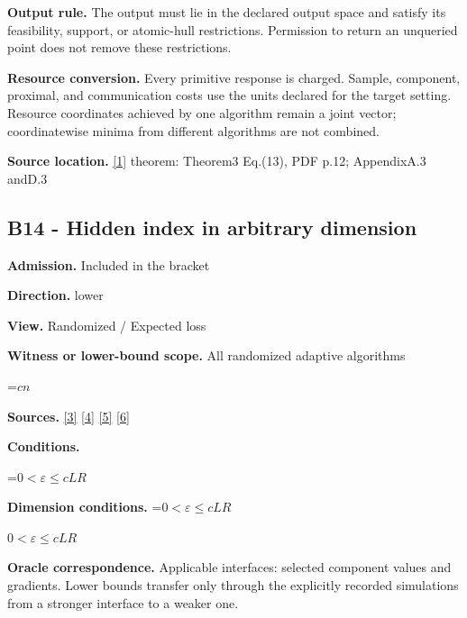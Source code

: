 \documentclass[10pt,a4paper]{article}
\newcommand{\AtlasMath}[1]{\par\begingroup\centering\setbox0=\hbox{$\displaystyle #1$}\ifdim\wd0>1.4\linewidth\typeout{ATLAS WIDE FORMULA: \the\wd0}\fi\ifdim\wd0>\linewidth\resizebox{\linewidth}{!}{\box0}\else\box0\fi\par\endgroup}
\newcommand{\AtlasInlineMath}[1]{\begingroup\setbox0=\hbox{$#1$}\ifdim\wd0>.4\linewidth\endgroup\AtlasMath{#1}\else\endgroup$#1$\fi}
\begin{document}
\textbf{Output rule.} The output must lie in the declared output space and satisfy its feasibility, support, or atomic-hull restrictions. Permission to return an unqueried point does not remove these restrictions.



\textbf{Resource conversion.} Every primitive response is charged. Sample, component, proximal, and communication costs use the units declared for the target setting. Resource coordinates achieved by one algorithm remain a joint vector; coordinatewise minima from different algorithms are not combined.



\textbf{Source location.} \href{https://arxiv.org/pdf/2105.01778}{[1]} theorem: Theorem3 Eq.(13), PDF p.12; AppendixA.3 andD.3



\subsection{B14 - Hidden index in arbitrary dimension}


\textbf{Admission.} Included in the bracket



\textbf{Direction.} lower



\textbf{View.} Randomized / Expected loss



\textbf{Witness or lower-bound scope.} All randomized adaptive algorithms



\AtlasMath{cn}


\textbf{Sources.} \href{https://arxiv.org/pdf/2311.10886}{[3]} \href{https://arxiv.org/pdf/1405.4980}{[4]} \href{https://www2.isye.gatech.edu/~nemirovs/MOR_AccuracyCertificates.pdf}{[5]} \href{https://arxiv.org/pdf/2609.20701}{[6]}



\textbf{Conditions.}
\AtlasMath{0<\varepsilon\le cLR}




\textbf{Dimension conditions.} \AtlasInlineMath{0<\varepsilon\le cLR}



\textbf{Oracle correspondence.} Applicable interfaces: selected component values and gradients. Lower bounds transfer only through the explicitly recorded simulations from a stronger interface to a weaker one.
\end{document}
